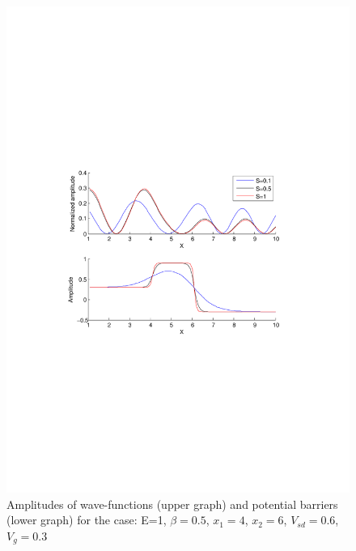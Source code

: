 \documentclass[a4paper]{article}
\begin{document}
\begin{figure}[h!]
\centering
\includegraphics[width=4.5in]{test2}
\caption{Amplitudes of wave-functions (upper graph) and potential barriers (lower graph) for the case: E=1, $\beta=0.5$, $x_1=4$, $x_2=6$, $V_{sd}=0.6$, $V_g=0.3$}
\label{fig:test2}
\end{figure}
\newpage
\end{document}
